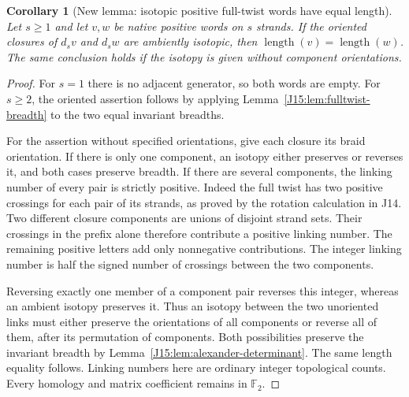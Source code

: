 \documentclass[11pt,oneside]{report}
\newtheorem{corollary}[theorem]{Corollary}
\theoremstyle{definition}
\numberwithin{equation}{section}
\newcommand{\length}{\operatorname{length}}
\begin{document}
\begin{corollary}[New lemma: isotopic positive full-twist words have equal length]
\label{J15:cor:isotopic-fulltwist-length}
Let $s\geq1$ and let $v,w$ be native positive words on $s$ strands.
If the oriented closures of $d_sv$ and $d_sw$ are ambiently isotopic,
then $\length(v)=\length(w)$.
The same conclusion holds if the isotopy is given without component
orientations.
\end{corollary}
\begin{proof}
For $s=1$ there is no adjacent generator, so both words are empty.
For $s\geq2$, the oriented assertion follows by applying
Lemma~\ref{J15:lem:fulltwist-breadth} to the two equal invariant breadths.

For the assertion without specified orientations, give each closure
its braid orientation. If there is only one component, an isotopy
either preserves or reverses it, and both cases preserve breadth.
If there are several components, the linking number of every pair
is strictly positive. Indeed the full twist has two positive
crossings for each pair of its strands, as proved by the rotation
calculation in J14. Two different closure components are unions of
disjoint strand sets. Their crossings in the prefix alone therefore
contribute a positive linking number. The remaining positive letters
add only nonnegative contributions. The integer linking number is
half the signed number of crossings between the two components.

Reversing exactly one member of a component pair reverses this
integer, whereas an ambient isotopy preserves it. Thus an isotopy
between the two unoriented links must either preserve the orientations
of all components or reverse all of them, after its permutation of
components. Both possibilities preserve the invariant breadth by
Lemma~\ref{J15:lem:alexander-determinant}. The same length equality
follows. Linking numbers here are ordinary integer topological
counts. Every homology and matrix coefficient remains in
$\mathbb F_2$.
\end{proof}
\end{document}
